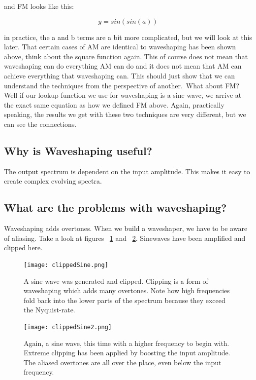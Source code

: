 and FM looks like this:

\begin{equation}
	y = sin(sin(a))
\end{equation}

in practice, the a and b terms are a bit more complicated, but we will look at this later. That certain cases of AM are identical to waveshaping has been shown above, think about the square function again. 
This of course does not mean that waveshaping can do everything AM can do and it does not mean that AM can achieve everything that waveshaping can. This should just show that we can understand the techniques from the perspective of another.\
What about FM? Well if our lookup function we use for waveshaping is a sine wave, we arrive at the exact same equation as how we defined FM above. Again, practically speaking, the results we get with these two techniques are very different, but we can see the connections.


\subsection{Why is Waveshaping useful?}
The output spectrum is dependent on the input amplitude. This makes it easy to create complex evolving spectra.

\subsection{What are the problems with waveshaping?}

Waveshaping adds overtones. When we build a waveshaper, we have to be aware of aliasing. Take a look at figures ~\ref{fig:clipped1} and ~\ref{fig:clipped2}. Sinewaves have been amplified and clipped here. 

\begin{figure}[h!]
	\centering
	\texttt{[image: clippedSine.png]}
	\caption[clipped sine wave]
	{A sine wave was generated and clipped. Clipping is a form of waveshaping which adds many overtones. Note how high frequencies fold back into the lower parts of the spectrum because they exceed the Nyquist-rate.}
	\label{fig:clipped1}
\end{figure}

\begin{figure}[h!]
	\centering
	\texttt{[image: clippedSine2.png]}
	\caption[clipped sine wave 2]
	{Again, a sine wave, this time with a higher frequency to begin with. Extreme clipping has been applied by boosting the input amplitude. The aliased overtones are all over the place, even below the input frequency.}
	\label{fig:clipped2}
\end{figure}

